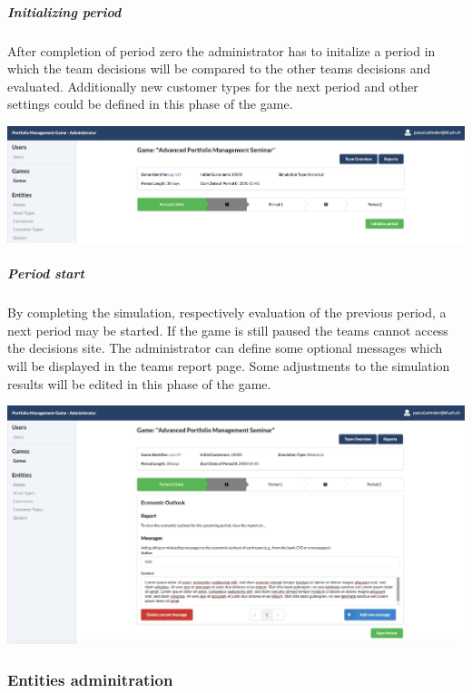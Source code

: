 \subparagraph{Initializing period}
After completion of period zero the administrator has to initalize a period in which the team decisions will be compared to the other teams decisions and evaluated. Additionally new customer types for the next period and other settings could be defined in this phase of the game.
\begin{center}
  \includegraphics[scale=0.2]{img/application-overview/administrator/period_initialization.png}
\end{center}

\subparagraph{Period start}
By completing the simulation, respectively evaluation of the previous period, a next period may be started. If the game is still paused the teams cannot access the decisions site. The administrator can define some optional messages which will be displayed in the teams report page. Some adjustments to the simulation results will be edited in this phase of the game.
\begin{center}
  \includegraphics[scale=0.2]{img/application-overview/administrator/period_start.png}
\end{center}

\subsubsection{Entities adminitration}

